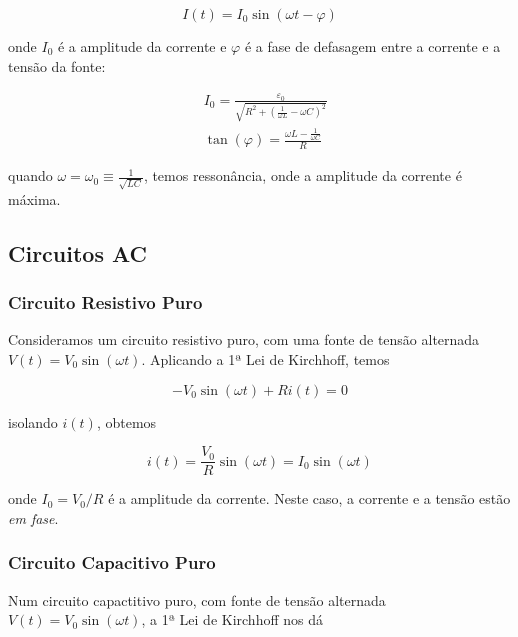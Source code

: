 \documentclass[12pt]{article}
\begin{document}
\begin{equation}
    \boxed{I(t) = I_0 \sin(\omega t - \varphi)}
\end{equation}

\noindent onde \(I_0\) é a amplitude da corrente e \(\varphi\) é a fase de defasagem entre a corrente e a tensão da fonte:

\begin{align}
    &I_0 = \frac{\varepsilon_0}{\sqrt{R^2 + \left(\frac{1}{\omega L} - \omega C\right)^2}} \\
    &\tan(\varphi) = \frac{\omega L - \frac{1}{\omega C}}{R}
\end{align}

\noindent quando \(\displaystyle \omega = \omega_0 \equiv \frac{1}{\sqrt{LC}}\), temos ressonância, onde a amplitude da corrente é máxima.

\subsection{Circuitos AC}

\subsubsection{Circuito Resistivo Puro}

Consideramos um circuito resistivo puro, com uma fonte de tensão alternada \(V(t) = V_0 \sin(\omega t)\). Aplicando a 1ª Lei de Kirchhoff, temos

\begin{equation}
    - V_0 \sin(\omega t) + R i(t) = 0
\end{equation}

\noindent isolando \(i(t)\), obtemos

\begin{equation}
    \boxed{i(t) = \frac{V_0}{R} \sin(\omega t) = I_0 \sin(\omega t)}
\end{equation}

\noindent onde \(\displaystyle I_0 = V_0/R\) é a amplitude da corrente. Neste caso, a corrente e a tensão estão \emph{em fase}.

\subsubsection{Circuito Capacitivo Puro}

Num circuito capactitivo puro, com fonte de tensão alternada \(V(t) = V_0 \sin(\omega t)\), a 1ª Lei de Kirchhoff nos dá
\end{document}
